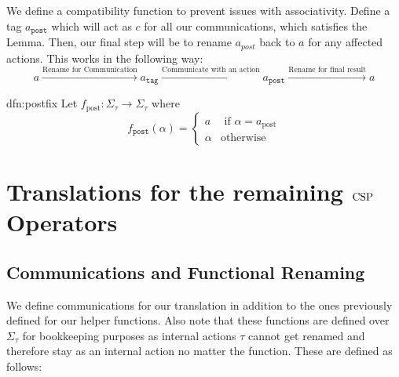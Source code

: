 \documentclass[../hons_project.tex]{subfiles}
\begin{document}

We define a compatibility function to prevent issues with associativity. Define a tag $a_{\mathtt{post}}$ which will act as $c$ for all our communications, which satisfies the Lemma. Then, our final step will be to rename $a_{post}$ back to $a$ for any affected actions. This works in the following way:
\[a \xrightarrow{\text{Rename for Communication}} a_{\mathtt{tag}} \xrightarrow{\text{Communicate with an action}} a_{\mathtt{post}} \xrightarrow{\text{Rename for final result}} a\]

\begin{dfn}{dfn:postfix}{}
	Let $f_{\mathrm{post}} : \Sigma_{\tau} \to \Sigma_{\tau}$ where
	\vspace{-5pt}
	\[f_{\mathtt{post}}(\alpha) = \begin{cases}
			a      & \text{ if } \alpha = a_{\mathrm{post}} \\
			\alpha & \text{otherwise}
		\end{cases}\]
\end{dfn}

\newpage
\section{Translations for the remaining \texorpdfstring{$\mathrm{CSP}$}{CSP} Operators}

\subsection{Communications and Functional Renaming}

We define communications for our translation in addition to the ones previously defined for our helper functions. Also note that these functions are defined over $\Sigma_{\tau}$ for bookkeeping purposes as internal actions $\tau$ cannot get renamed and therefore stay as an internal action no matter the function. These are defined as follows:
\end{document}
